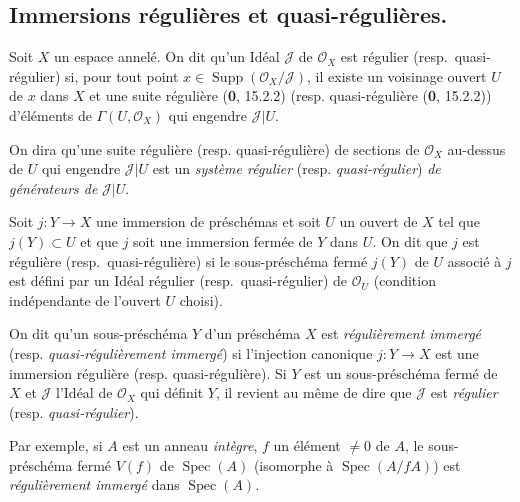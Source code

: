 \subsection{Immersions régulières et quasi-régulières.}

\begin{definition}[16.9.1]
Soit $X$ un espace annelé. On dit qu'un Idéal $\mathscr{J}$ de
$\mathcal{O}_X$ est régulier \textup{(resp.}\ quasi-régulier\textup{)} si, pour
tout point $x\in\operatorname{Supp}(\mathcal{O}_X/\mathscr{J})$, il existe un
voisinage ouvert $U$ de $x$ dans $X$ et une suite régulière \textup{(\textbf{0}, 15.2.2) (resp.}
quasi-régulière \textup{(\textbf{0}, 15.2.2))} d'éléments de $\Gamma(U,\mathcal{O}_X)$ qui
engendre $\mathscr{J}|U$.
\end{definition}

On dira qu'une suite régulière (resp. quasi-régulière) de sections de
$\mathcal{O}_X$ au-dessus de $U$ qui engendre $\mathscr{J}|U$ est un
\emph{système régulier} (resp. \emph{quasi-régulier}) \emph{de générateurs
de} $\mathscr{J}|U$.

\begin{definition}[16.9.2]
Soit $j:Y\to X$ une immersion de préschémas et soit $U$ un ouvert de $X$ tel
que $j(Y)\subset U$ et que $j$ soit une immersion fermée de $Y$ dans $U$. On
dit que $j$ est régulière \textup{(resp.}\ quasi-régulière\textup{)} si le
sous-préschéma fermé $j(Y)$ de $U$ associé à $j$ est défini par un Idéal
régulier \textup{(resp.}\ quasi-régulier\textup{)} de $\mathcal{O}_U$ \textup{(condition indépendante de
l'ouvert $U$ choisi)}.
\end{definition}

On dit qu'un sous-préschéma $Y$ d'un préschéma $X$ est \emph{régulièrement
immergé} (resp. \emph{quasi-régulièrement immergé}) si l'injection canonique
$j:Y\to X$ est une immersion régulière (resp. quasi-régulière). Si $Y$ est un
sous-préschéma fermé de $X$ et $\mathscr{J}$ l'Idéal de $\mathcal{O}_X$ qui
définit $Y$, il revient au même de dire que $\mathscr{J}$ est \emph{régulier}
(resp. \emph{quasi-régulier}).

Par exemple, si $A$ est un anneau \emph{intègre}, $f$ un élément $\neq0$ de
$A$, le sous-préschéma fermé $V(f)$ de $\operatorname{Spec}(A)$ (isomorphe à
$\operatorname{Spec}(A/fA)$) est \emph{régulièrement immergé} dans
$\operatorname{Spec}(A)$.

